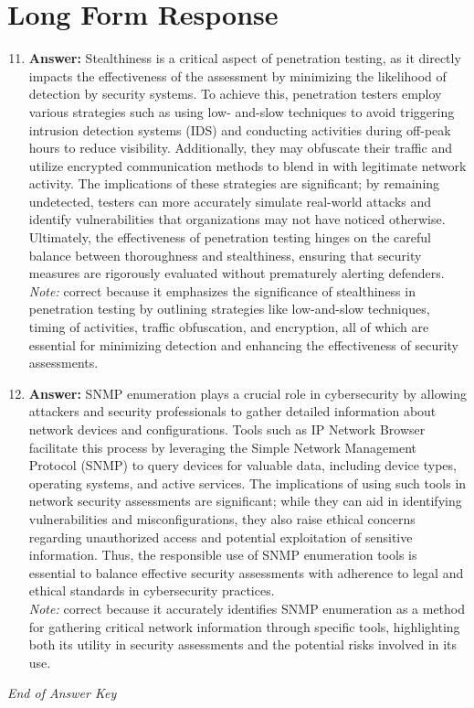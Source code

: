 \documentclass[12pt]{article}
\begin{document}
\section*{Long Form Response}
\begin{enumerate}[label=\arabic*.]
\setcounter{enumi}{10}
\item \textbf{Answer:} Stealthiness is a critical aspect of penetration testing, as it directly impacts the effectiveness of the assessment by minimizing the likelihood of detection by security systems. To achieve this, penetration testers employ various strategies such as using low- and-slow techniques to avoid triggering intrusion detection systems (IDS) and conducting activities during off-peak hours to reduce visibility. Additionally, they may obfuscate their traffic and utilize encrypted communication methods to blend in with legitimate network activity. The implications of these strategies are significant; by remaining undetected, testers can more accurately simulate real-world attacks and identify vulnerabilities that organizations may not have noticed otherwise. Ultimately, the effectiveness of penetration testing hinges on the careful balance between thoroughness and stealthiness, ensuring that security measures are rigorously evaluated without prematurely alerting defenders.
\\ \textit{Note:} correct because it emphasizes the significance of stealthiness in penetration testing by outlining strategies like low-and-slow techniques, timing of activities, traffic obfuscation, and encryption, all of which are essential for minimizing detection and enhancing the effectiveness of security assessments.
\item \textbf{Answer:} SNMP enumeration plays a crucial role in cybersecurity by allowing attackers and security professionals to gather detailed information about network devices and configurations. Tools such as IP Network Browser facilitate this process by leveraging the Simple Network Management Protocol (SNMP) to query devices for valuable data, including device types, operating systems, and active services. The implications of using such tools in network security assessments are significant; while they can aid in identifying vulnerabilities and misconfigurations, they also raise ethical concerns regarding unauthorized access and potential exploitation of sensitive information. Thus, the responsible use of SNMP enumeration tools is essential to balance effective security assessments with adherence to legal and ethical standards in cybersecurity practices.
\\ \textit{Note:} correct because it accurately identifies SNMP enumeration as a method for gathering critical network information through specific tools, highlighting both its utility in security assessments and the potential risks involved in its use.
\end{enumerate}

\vfill
\noindent\textit{End of Answer Key}
\end{document}
